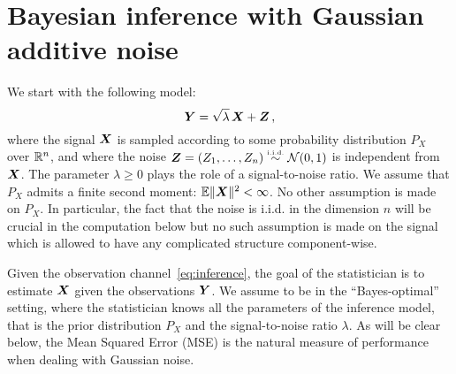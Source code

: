 \documentclass[12pt,nocut]{article}
\begin{document}
\section{Bayesian inference with Gaussian additive noise}\label{sec:i_mmse}

We start with the following model:
\begin{equation}\label{eq:inference}
	{\boldsymbol Y} = \sqrt{\lambda} \, {\boldsymbol X} + {\boldsymbol Z} \,,
\end{equation}
where the signal ${\boldsymbol X}$ is sampled according to some probability distribution $P_X$ over $\mathbb{R}^n$, and where the noise ${\boldsymbol Z} =(Z_1, \dots, Z_n) \overset{\text{\tiny i.i.d.}}{\sim} \mathcal{N}(0,1)$ is independent from ${\boldsymbol X}$. 
The parameter $\lambda \geq 0$ plays the role of a signal-to-noise ratio.
We assume that $P_X$ admits a finite second moment: $\mathbb{E} \|{\boldsymbol X}\|^2 < \infty$. No other assumption is made on $P_X$. In particular, the fact that the noise is i.i.d. in the dimension $n$ will be crucial in the computation below but no such assumption is made on the signal which is allowed to have any complicated structure component-wise.

Given the observation channel~\eqref{eq:inference}, the goal of the statistician is to estimate ${\boldsymbol X}$ given the observations ${\boldsymbol Y}$. We assume to be in the ``Bayes-optimal'' setting, where the statistician knows all the parameters of the inference model, that is the prior distribution $P_X$ and the signal-to-noise ratio $\lambda$. 
As will be clear below, the Mean Squared Error (MSE) is the natural measure of performance when dealing with Gaussian noise.
\end{document}
